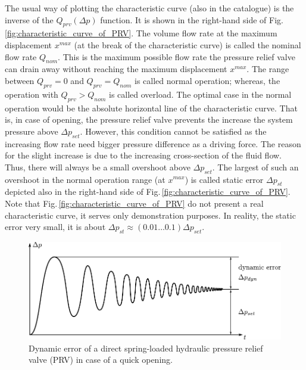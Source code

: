 The usual way of plotting the characteristic curve (also in the catalogue) is the inverse of the $Q_{prv}(\Delta p)$ function. It is shown in the right-hand side of Fig.\,\ref{fig:characteristic_curve_of_PRV}. The volume flow rate at the maximum displacement $x^{max}$ (at the break of the characteristic curve) is called the nominal flow rate $Q_{nom}$. This is the maximum possible flow rate the pressure relief valve can drain away without reaching the maximum displacement $x^{max}$. The range between $Q_{prv}=0$ and $Q_{prv}=Q_{nom}$ is called normal operation; whereas, the operation with $Q_{prv}>Q_{nom}$ is called overload. The optimal case in the normal operation would be the absolute horizontal line of the characteristic curve. That is, in case of opening, the pressure relief valve prevents the increase the system pressure above $\Delta p_{set}$. However, this condition cannot be satisfied as the increasing flow rate need bigger pressure difference as a driving force. The reason for the slight increase is due to the increasing cross-section of the fluid flow. Thus, there will always be a small overshoot above $\Delta p_{set}$. The largest of such an overshoot in the normal operation range (at $x^{max}$) is called static error $\Delta p_{st}$ depicted also in the right-hand side of Fig.\,\ref{fig:characteristic_curve_of_PRV}. Note that Fig.\,\ref{fig:characteristic_curve_of_PRV} do not present a real characteristic curve, it serves only demonstration purposes. In reality, the static error very small, it is about $\Delta p_{st} \approx (0.01 \dots 0.1) \Delta p_{set}$.

\begin{figure}[ht!]
	\centering
		\includegraphics[width=12cm]{PositiveDisplacementPumps/Figures/Dynamic_Error_Pressure_Relief_Valve.pdf}
	\caption{Dynamic error of a direct spring-loaded hydraulic pressure relief valve (PRV) in case of a quick opening.}
	\label{fig:dynamic_error_of_direct_spring_loaded_PRV}
\end{figure}


